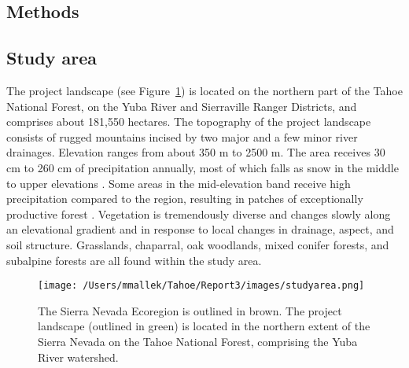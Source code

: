 \documentclass[12pt]{article}
\begin{document}
\begin{spacing}{1}

\section{Methods}

\subsection*{Study area}
The project landscape (see Figure~\ref{projectarea}) is located on the northern part of the Tahoe National Forest, on the Yuba River and Sierraville Ranger Districts, and comprises about 181,550 hectares. The topography of the project landscape consists of rugged mountains incised by two major and a few minor river drainages. Elevation ranges from about 350 m to 2500 m. The area receives 30 cm to 260 cm of precipitation annually, most of which falls as snow in the middle to upper elevations \citep{Storer1963}. Some areas in the mid-elevation band receive high precipitation compared to the region, resulting in patches of exceptionally productive forest \citep{Littell2012}. Vegetation is tremendously diverse and changes slowly along an elevational gradient and in response to local changes in drainage, aspect, and soil structure. Grasslands, chaparral, oak woodlands, mixed conifer forests, and subalpine forests are all found within the study area. 

\begin{figure}
\centering
\texttt{[image: /Users/mmallek/Tahoe/Report3/images/studyarea.png]}
\caption{The Sierra Nevada Ecoregion is outlined in brown. The project landscape (outlined in green) is located in the northern extent of the Sierra Nevada on the Tahoe National Forest, comprising the Yuba River watershed.}
\label{projectarea}
\end{figure}



\end{spacing}
\end{document}

